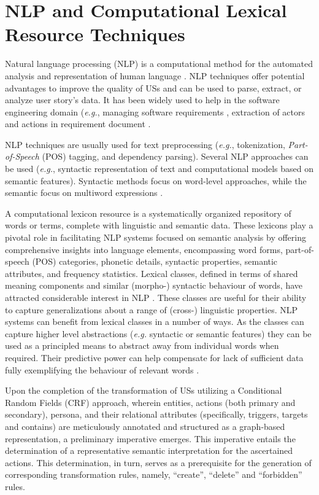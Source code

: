 \section{NLP and Computational Lexical Resource Techniques}\label{nlp}
Natural language processing (NLP) is a computational method for the automated analysis and representation of human language \cite{cambria2014jumping}. NLP techniques offer potential advantages to improve the quality of USs and can be used to parse, extract, or analyze user story's data. It has been widely used to help in the software engineering domain (\emph{e.g.}, managing software requirements \cite{Arias2018}, extraction of actors and actions in requirement document \cite{al2018use}.

NLP techniques are usually used for text preprocessing (\emph{e.g.}, tokenization, \emph{Part-of-Speech} (POS) tagging, and dependency parsing). Several NLP approaches can be used (\emph{e.g.}, syntactic representation of text and computational models based on semantic features). Syntactic methods focus on word-level approaches, while the semantic focus on multiword expressions \cite{cambria2014jumping}.

A computational lexicon resource is a systematically organized repository of words or terms, complete with linguistic and semantic data. These lexicons play a pivotal role in facilitating NLP systems focused on semantic analysis by offering comprehensive insights into language elements, encompassing word forms, part-of-speech (POS) categories, phonetic details, syntactic properties, semantic attributes, and frequency statistics. Lexical classes, defined in terms of shared meaning components and similar (morpho-) syntactic behaviour of words, have attracted considerable interest in NLP \cite{cambria2014jumping}. These classes are useful for their ability to capture generalizations about a range of (cross-) linguistic properties. NLP systems can benefit from lexical classes in a number of ways. As the classes can capture higher level abstractions (\emph{e.g.} syntactic or semantic features) they can be used as a principled means to abstract away from individual words when required. Their predictive power can help compensate for lack of sufficient data fully exemplifying the behaviour of relevant words \cite{kipper2006extending}.

Upon the completion of the transformation of USs utilizing a Conditional Random Fields (CRF) approach, wherein entities, actions (both primary and secondary), persona, and their relational attributes (specifically, triggers, targets and contains) are meticulously annotated and structured as a graph-based representation, a preliminary imperative emerges. This imperative entails the determination of a representative semantic interpretation for the ascertained actions. This determination, in turn, serves as a prerequisite for the generation of corresponding transformation rules, namely, \enquote{create}, \enquote{delete} and \enquote{forbidden} rules.


